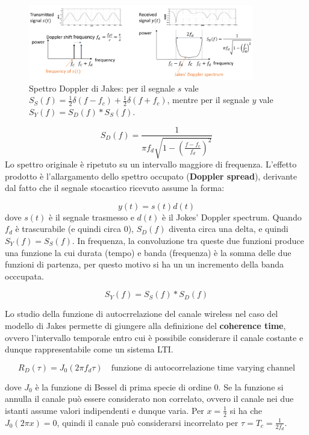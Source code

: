 \begin{figure}[ht]
    \centering
    \includegraphics[width=0.875\textwidth]{imgs/jakes.jpg}
    \captionsetup{width=.5\textwidth}
    \caption*{Spettro Doppler di Jakes:
        per il segnale $s$ vale \( S_S(f) = \frac{1}{2} \delta \left(f - f_c \right) + \frac{1}{2} \delta \left(f + f_c\right) \),
        mentre per il segnale $y$ vale \( S_Y(f) = S_D(f) \ast S_S(f) \).
    }
\end{figure}

\[
    S_D(f) = \frac{1}{\pi f_d \sqrt{1 - \left(\frac{f - f_c}{f_d}\right)^2}}
\]
Lo spettro originale è ripetuto su un intervallo maggiore di frequenza. L'effetto prodotto è l'allargamento dello spettro occupato (\textbf{Doppler spread}), derivante dal fatto che il segnale stocastico ricevuto assume la forma:

\[
    y(t) = s(t) d(t)
\]
dove $s(t)$ è il segnale trasmesso e $d(t)$ è il Jokes' Doppler spectrum. Quando $f_d$ è trascurabile (e quindi circa 0), $S_D(f)$ diventa circa una delta, e quindi $S_Y(f) = S_S(f)$. In frequenza, la convoluzione tra queste due funzioni produce una funzione la cui durata (tempo) e banda (frequenza) è la somma delle due funzioni di partenza, per questo motivo si ha un un incremento della banda occcupata.

\[
    S_Y(f) = S_S(f) \ast S_D(f)
\]

Lo studio della funzione di autocrrelazione del canale wireless nel caso del modello di Jakes permette di giungere alla definizione del \textbf{coherence time}, ovvero l'intervallo temporale entro cui è possibile considerare il canale costante e dunque rappresentabile come un sistema LTI.


\[
    R_D (\tau) = J_0(2\pi f_d \tau) \quad \text{funzione di autocorrelazione time varying channel}
\]

dove $J_0$ è la funzione di Bessel di prima specie di ordine 0.  Se la funzione si annulla il canale può essere considerato non correlato, ovvero il canale nei due istanti assume valori indipendenti e dunque varia.
Per $x=\frac{1}{2}$ si ha che $J_0(2\pi x) = 0$, quindi il canale può considerarsi incorrelato per $\tau = T_c = \frac{1}{2f_d}$.

